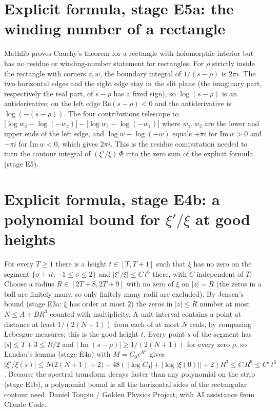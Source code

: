 \documentclass{report}
\theoremstyle{definition}
\begin{document}
\begin{itemize}
\begin{itemize}
\section{Explicit formula, stage E5a: the winding number of a rectangle}
Mathlib proves Cauchy's theorem for a rectangle with holomorphic interior but has no residue or winding-number statement for rectangles. For $\rho$ strictly inside the rectangle with corners $z,w$, the boundary integral of $1/(s-\rho)$ is $2\pi i$. The two horizontal edges and the right edge stay in the slit plane (the imaginary part, respectively the real part, of $s-\rho$ has a fixed sign), so $\log(s-\rho)$ is an antiderivative; on the left edge $\mathrm{Re}(s-\rho)<0$ and the antiderivative is $\log(-(s-\rho))$. The four contributions telescope to $\bigl[\log w_2-\log(-w_2)\bigr]-\bigl[\log w_1-\log(-w_1)\bigr]$ where $w_1,w_2$ are the lower and upper ends of the left edge, and $\log w-\log(-w)$ equals $+\pi i$ for $\mathrm{Im}\,w>0$ and $-\pi i$ for $\mathrm{Im}\,w<0$, which gives $2\pi i$. This is the residue computation needed to turn the contour integral of $(\xi'/\xi)\,\Phi$ into the zero sum of the explicit formula (stage E5).
\section{Explicit formula, stage E4b: a polynomial bound for $\xi'/\xi$ at good heights}
For every $T\ge1$ there is a height $t\in[T,T+1]$ such that $\xi$ has no zero on the segment $\{\sigma+it:-1\le\sigma\le2\}$ and $|\xi'/\xi|\le C\,t^{6}$ there, with $C$ independent of $T$. Choose a radius $R\in[2T+8,2T+9]$ with no zero of $\xi$ on $|z|=R$ (the zeros in a ball are finitely many, so only finitely many radii are excluded). By Jensen's bound (stage E3a: $\xi$ has order at most $2$) the zeros in $|z|\le R$ number at most $N\le A+BR^{3}$ counted with multiplicity. A unit interval contains a point at distance at least $1/(2(N+1))$ from each of at most $N$ reals, by comparing Lebesgue measures; this is the good height $t$. Every point $s$ of the segment has $|s|\le T+3\le R/2$ and $|\operatorname{Im}(s-\rho)|\ge1/(2(N+1))$ for every zero $\rho$, so Landau's lemma (stage E4a) with $M=C_0e^{R^{3}}$ gives
$|\xi'/\xi(s)|\le N\bigl(2(N+1)+2\bigr)+48(\,|\log C_0|+|\log|\xi(0)||+2)R^{3}\le C\,R^{6}\le C'\,t^{6}$. Because the spectral transform decays faster than any polynomial on the strip (stage E1b), a polynomial bound is all the horizontal sides of the rectangular contour need.
Daniel Toupin / Golden Physics Project, with AI assistance from Claude Code.



\end{itemize}
\end{itemize}
\end{document}
